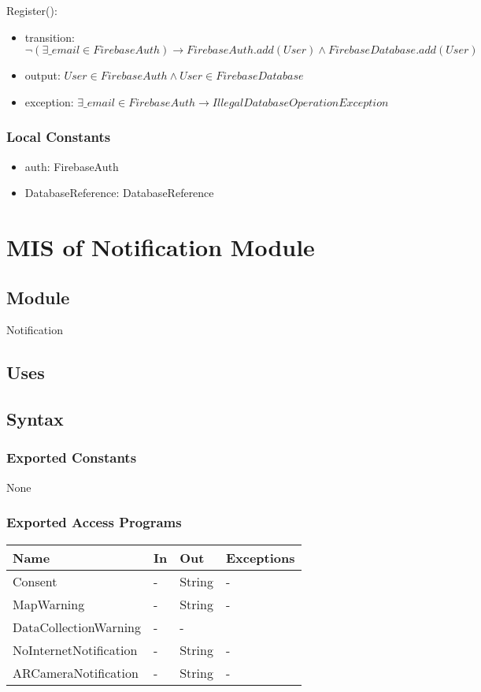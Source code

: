 \documentclass[12pt, titlepage]{article}
\begin{document}
\noindent Register():
\begin{itemize}
\item transition: $\lnot(\exists \_email \in FirebaseAuth) \rightarrow FirebaseAuth.add(User) \land FirebaseDatabase.add(User)$ 
\item output: $User \in FirebaseAuth \land User \in FirebaseDatabase$
\item exception: $\exists \_email \in FirebaseAuth \rightarrow IllegalDatabaseOperationException$
\end{itemize}

\subsubsection{Local Constants}

\begin{itemize}
  \item auth: FirebaseAuth
  \item DatabaseReference: DatabaseReference
\end{itemize}

\newpage

\section{MIS of Notification Module} \label{mNotify}

\subsection{Module}

Notification

\subsection{Uses}

\subsection{Syntax}

\subsubsection{Exported Constants}
None

\subsubsection{Exported Access Programs}
\begin{center}
\begin{tabular}{p{4cm} p{2cm} p{4cm} p{4cm}}
\hline
\textbf{Name} & \textbf{In} & \textbf{Out} & \textbf{Exceptions} \\
\hline
Consent & - & String & - \\
MapWarning & - & String & - \\
DataCollectionWarning & - & -\\
NoInternetNotification & - & String & -\\
ARCameraNotification & - & String & -\\
\hline
\end{tabular}
\end{center}
\end{document}
